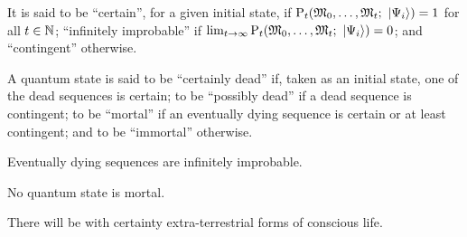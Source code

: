 It is said to be ``certain'', for a given initial state, if $\mathrm P_t(\mathfrak{M}_0, \dotsc, \mathfrak{M}_t; \ \left|{\Psi_i}\right\rangle) = 1$ for all $t \in \mathbb{N}$; ``infinitely improbable'' if $\lim_{t \to \infty} \mathrm P_t(\mathfrak{M}_0, \dotsc, \mathfrak{M}_t; \ \left|{\Psi_i}\right\rangle) = 0$; and ``contingent'' otherwise.

A quantum state is said to be ``certainly dead'' if, taken as an initial state, one of the dead sequences is certain; to be ``possibly dead'' if a dead sequence is contingent; to be ``mortal'' if an eventually dying sequence is certain or at least contingent; and to be ``immortal'' otherwise.

 Eventually dying sequences are infinitely improbable.

 No quantum state is mortal.

 There will be with certainty extra-terrestrial forms of conscious life.





